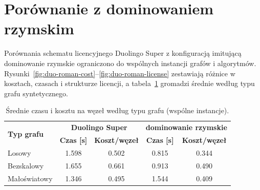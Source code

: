 \section{Porównanie z dominowaniem rzymskim}

Porównania schematu licencyjnego Duolingo Super z konfiguracją imitującą dominowanie rzymskie ograniczono do wspólnych instancji grafów i algorytmów. Rysunki~\ref{fig:duo-roman-cost}--\ref{fig:duo-roman-license} zestawiają różnice w kosztach, czasach i strukturze licencji, a tabela~\ref{tab:duo-roman-graph} gromadzi średnie według typu grafu syntetycznego.

\begin{table}[H]
  \centering
  \caption{Średnie czasu i kosztu na węzeł według typu grafu (wspólne instancje).}
  \label{tab:duo-roman-graph}
  \begin{tabular}{lcccc}
    \toprule
    \multirow{2}{*}{\textbf{Typ grafu}} & \multicolumn{2}{c}{\textbf{Duolingo Super}} & \multicolumn{2}{c}{\textbf{dominowanie rzymskie}}                                            \\
                                        & \textbf{Czas [s]}                           & \textbf{Koszt/węzeł}                              & \textbf{Czas [s]} & \textbf{Koszt/węzeł} \\
    \midrule
    Losowy                              & 1.598                                       & 0.502                                             & 0.815             & 0.344                \\
    Bezskalowy                          & 1.655                                       & 0.661                                             & 0.913             & 0.490                \\
    Małoświatowy                        & 1.346                                       & 0.495                                             & 1.544             & 0.409                \\
    \bottomrule
  \end{tabular}
\end{table}

